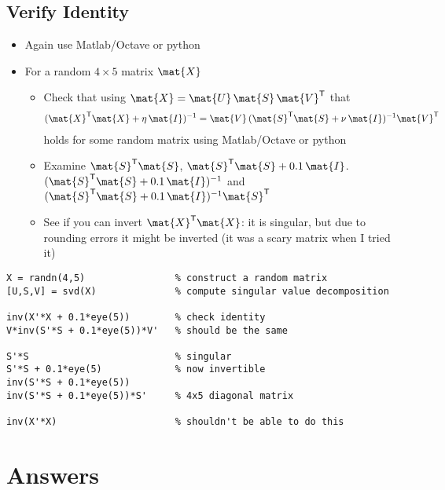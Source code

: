 \documentclass[11pt]{article}
\newcommand{\tr}{\textsf{T}}
\begin{document}
\subsection{Verify Identity}
\label{sec:org66076d8}
\begin{itemize}
\item Again use Matlab/Octave or python
\item For a random \(4\times5\) matrix \(\mat{X}\)
\begin{itemize}
\item Check that using \(\mat{X} = \mat{U}\,\mat{S}\,\mat{V}^\tr\) that
\begin{align*}
 (\mat{X}^\tr\mat{X} + \eta\,\mat{I})^{-1} 
  = \mat{V}\,(\mat{S}^\tr\mat{S}+\nu\,\mat{I})^{-1}\mat{V}^\tr
\end{align*}
holds for some random matrix using Matlab/Octave or python
\item Examine \(\mat{S}^\tr\mat{S}\), \(\mat{S}^\tr\mat{S}+0.1\,\mat{I}\).
\((\mat{S}^\tr\mat{S}+0.1\,\mat{I})^{-1}\) and
\((\mat{S}^\tr\mat{S}+0.1\,\mat{I})^{-1} \mat{S}^\tr\)
\item See if you can invert \(\mat{X}^\tr\mat{X}\): it is singular,
but due to rounding errors it might be inverted (it was a scary
matrix when I tried it)
\end{itemize}
\end{itemize}

\begin{verbatim}
X = randn(4,5)                % construct a random matrix
[U,S,V] = svd(X)              % compute singular value decomposition

inv(X'*X + 0.1*eye(5))        % check identity
V*inv(S'*S + 0.1*eye(5))*V'   % should be the same

S'*S                          % singular
S'*S + 0.1*eye(5)             % now invertible
inv(S'*S + 0.1*eye(5))        
inv(S'*S + 0.1*eye(5))*S'     % 4x5 diagonal matrix

inv(X'*X)                     % shouldn't be able to do this
\end{verbatim}

\section{Answers}
\label{sec:orgfe032a8}
\end{document}
